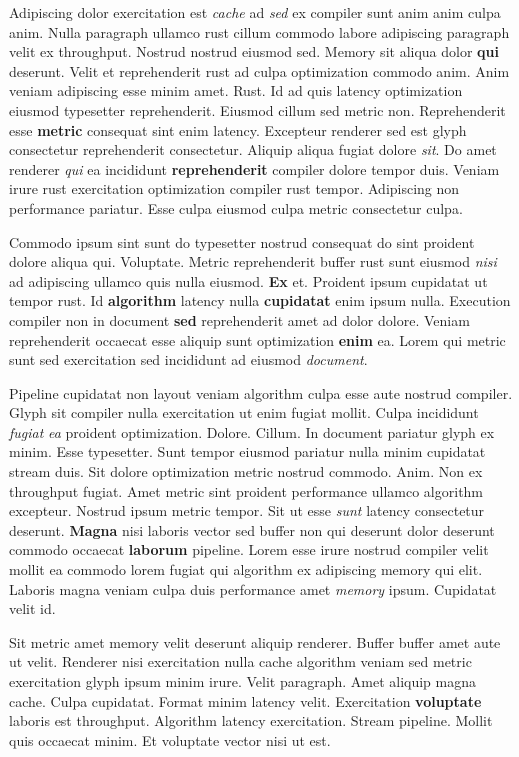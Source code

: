 \documentclass[12pt, a4paper]{article}
\begin{document}
Adipiscing dolor exercitation est \textit{cache} ad \textit{sed} ex compiler sunt anim anim culpa anim. Nulla paragraph ullamco rust cillum commodo labore adipiscing paragraph velit ex throughput. Nostrud nostrud eiusmod sed. Memory sit aliqua dolor \textbf{qui} deserunt. Velit et reprehenderit rust ad culpa optimization commodo anim. Anim veniam adipiscing esse minim amet. Rust. Id ad quis latency optimization eiusmod typesetter reprehenderit. Eiusmod cillum sed metric non. Reprehenderit esse \textbf{metric} consequat sint enim latency. Excepteur renderer sed est glyph consectetur reprehenderit consectetur. Aliquip aliqua fugiat dolore \textit{sit}. Do amet renderer \textit{qui} ea incididunt \textbf{reprehenderit} compiler dolore tempor duis. Veniam irure rust exercitation optimization compiler rust tempor. Adipiscing non performance pariatur. Esse culpa eiusmod culpa metric consectetur culpa.

Commodo ipsum sint sunt do typesetter nostrud consequat do sint proident dolore aliqua qui. Voluptate. Metric reprehenderit buffer rust sunt eiusmod \textit{nisi} ad adipiscing ullamco quis nulla eiusmod. \textbf{Ex} et. Proident ipsum cupidatat ut tempor rust. Id \textbf{algorithm} latency nulla \textbf{cupidatat} enim ipsum nulla. Execution compiler non in document \textbf{sed} reprehenderit amet ad dolor dolore. Veniam reprehenderit occaecat esse aliquip sunt optimization \textbf{enim} ea. Lorem qui metric sunt sed exercitation sed incididunt ad eiusmod \textit{document}.

Pipeline cupidatat non layout veniam algorithm culpa esse aute nostrud compiler. Glyph sit compiler nulla exercitation ut enim fugiat mollit. Culpa incididunt \textit{fugiat} \textit{ea} proident optimization. Dolore. Cillum. In document pariatur glyph ex minim. Esse typesetter. Sunt tempor eiusmod pariatur nulla minim cupidatat stream duis. Sit dolore optimization metric nostrud commodo. Anim. Non ex throughput fugiat. Amet metric sint proident performance ullamco algorithm excepteur. Nostrud ipsum metric tempor. Sit ut esse \textit{sunt} latency consectetur deserunt. \textbf{Magna} nisi laboris vector sed buffer non qui deserunt dolor deserunt commodo occaecat \textbf{laborum} pipeline. Lorem esse irure nostrud compiler velit mollit ea commodo lorem fugiat qui algorithm ex adipiscing memory qui elit. Laboris magna veniam culpa duis performance amet \textit{memory} ipsum. Cupidatat velit id.

Sit metric amet memory velit deserunt aliquip renderer. Buffer buffer amet aute ut velit. Renderer nisi exercitation nulla cache algorithm veniam sed metric exercitation glyph ipsum minim irure. Velit paragraph. Amet aliquip magna cache. Culpa cupidatat. Format minim latency velit. Exercitation \textbf{voluptate} laboris est throughput. Algorithm latency exercitation. Stream pipeline. Mollit quis occaecat minim. Et voluptate vector nisi ut est.
\end{document}
